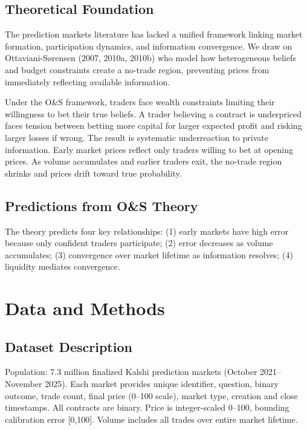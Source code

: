 \documentclass[a4paper,11pt]{article}
\theoremstyle{plain}
\theoremstyle{definition}
\begin{document}
\subsection{Theoretical Foundation}

The prediction markets literature has lacked a unified framework linking market formation, participation dynamics, and information convergence. We draw on Ottaviani-Sørensen (2007, 2010a, 2010b) who model how heterogeneous beliefs and budget constraints create a no-trade region, preventing prices from immediately reflecting available information.

Under the O\&S framework, traders face wealth constraints limiting their willingness to bet their true beliefs. A trader believing a contract is underpriced faces tension between betting more capital for larger expected profit and risking larger losses if wrong. The result is systematic underreaction to private information. Early market prices reflect only traders willing to bet at opening prices. As volume accumulates and earlier traders exit, the no-trade region shrinks and prices drift toward true probability.

\subsection{Predictions from O\&S Theory}

The theory predicts four key relationships: (1) early markets have high error because only confident traders participate; (2) error decreases as volume accumulates; (3) convergence over market lifetime as information resolves; (4) liquidity mediates convergence.

\section{Data and Methods}
\label{sec:data}

\subsection{Dataset Description}

Population: 7.3 million finalized Kalshi prediction markets (October 2021--November 2025). Each market provides unique identifier, question, binary outcome, trade count, final price (0--100 scale), market type, creation and close timestamps. All contracts are binary. Price is integer-scaled 0--100, bounding calibration error [0,100]. Volume includes all trades over entire market lifetime.
\end{document}
